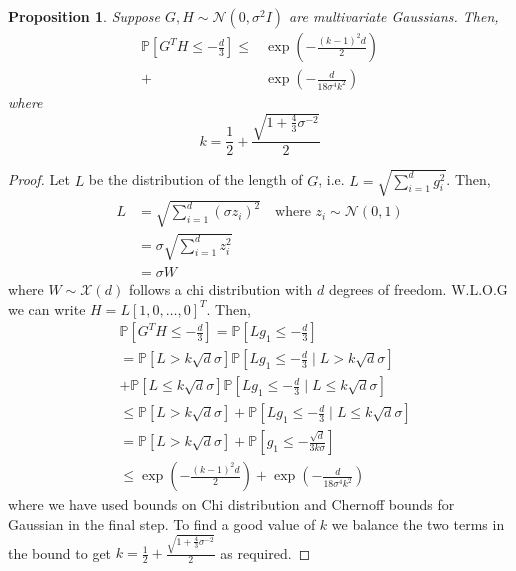 \documentclass{article}
\theoremstyle{plain}
\newtheorem{proposition}[theorem]{Proposition}
\theoremstyle{definition}
\theoremstyle{remark}
\begin{document}
\begin{proposition}
    Suppose \( G,H\sim\mathcal{N}(0,\sigma^2I) \) are multivariate Gaussians. Then,
    \begin{align}
        \mathbb{P}\left[G^T H\leq-\frac{d}{3}\right] \leq &\exp\left(-\frac{(k-1)^2 d}{2}\right)\\ + &\exp\left(-\frac{d}{18\sigma^4 k^2}\right)
    \end{align}
    where 
    \begin{equation}
        k = \frac{1}{2} + \frac{\sqrt{1+\frac{4}{3}\sigma^{-2}}}{2}
    \end{equation}
\end{proposition}
\begin{proof}
    Let \( L \) be the distribution of the length of \( G \), i.e. \( L = \sqrt{\sum_{i=1}^{d} g_i^2}  \). Then,
    \begin{align}
        L &= \sqrt{\sum_{i=1}^{d}(\sigma z_i)^2} \quad \text{where } z_i\sim\mathcal{N}(0,1) \\
          &= \sigma\sqrt{\sum_{i=1}^{d}z_i^2} \\
          &= \sigma W
    \end{align}
    where \( W\sim\mathcal{X}(d) \) follows a chi distribution with \( d \) degrees of freedom.
     W.L.O.G we can write \( H=L[1, 0, \ldots, 0]^T \). Then,
    \begin{align}
        &\mathbb{P}\left[G^T H\leq-\frac{d}{3}\right] = \mathbb{P}\left[Lg_1 \leq -\frac{d}{3}\right] \\
        &= \mathbb{P}\left[L>k\sqrt{d}\sigma\right]\mathbb{P}\left[Lg_1\leq -\frac{d}{3} \mid L > k\sqrt{d}\sigma \right]\\ &+ \mathbb{P}\left[L\leq k\sqrt{d}\sigma\right]\mathbb{P}\left[Lg_1 \leq -\frac{d}{3}\mid L\leq k\sqrt{d}\sigma \right] \\
        &\leq \mathbb{P}\left[L>k\sqrt{d}\sigma\right] + \mathbb{P}\left[Lg_1 \leq -\frac{d}{3}\mid L\leq k\sqrt{d}\sigma \right] \\
        &= \mathbb{P}\left[L>k\sqrt{d}\sigma\right] + \mathbb{P}\left[g_1 \leq -\frac{\sqrt{d} }{3k \sigma }\right] \\
        &\leq \exp\left(-\frac{(k-1)^2d}{2}\right) + \exp\left(-\frac{d}{18\sigma^4k^2}\right)
    \end{align}
    where we have used bounds on  Chi distribution  and Chernoff bounds for Gaussian in the final step.
    To find a good value of \( k \) we balance the two terms in the bound to get
      \(  k = \frac{1}{2} + \frac{\sqrt{1+\frac{4}{3}\sigma^{-2}}}{2} \) as required.
\end{proof}
\end{document}
